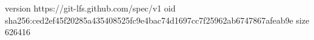 version https://git-lfs.github.com/spec/v1
oid sha256:ced2ef45f20285a435408525fc9e4bac74d1697cc7f25962ab6747867afeab9e
size 626416
